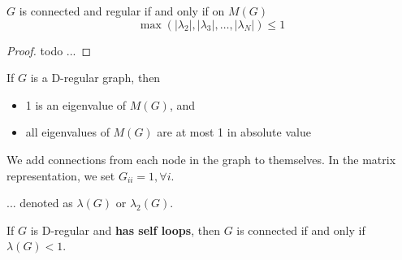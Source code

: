 \documentclass[11pt, letter]{book}
\begin{document}
\begin{proposition}
	$G$ is connected and regular if and only if on $M(G)$
	\begin{equation}
		\max ( |\lambda_2| , |\lambda_3|, \dots, |\lambda_N|) \leq 1
	\end{equation}
\end{proposition}

\begin{proof}
	todo ... 
\end{proof}

\begin{proposition}
	If $G$ is a D-regular graph, then
	\begin{itemize}
		\item 1 is an eigenvalue of $M(G)$, and 
		\item all eigenvalues of $M(G)$ are at most 1 in absolute value
	\end{itemize}
\end{proposition}

\begin{definition}
	We add connections from each node in the graph to themselves. In the matrix representation, we set $G_{ii} = 1, \forall i$. 
\end{definition}

\begin{definition}
	... denoted as $\lambda(G)$ or $\lambda_2(G)$. 
\end{definition}

\begin{lemma}
	If $G$ is D-regular and \textbf{has self loops}, then $G$ is connected if and only if $\lambda(G) < 1$.
\end{lemma}
\end{document}
